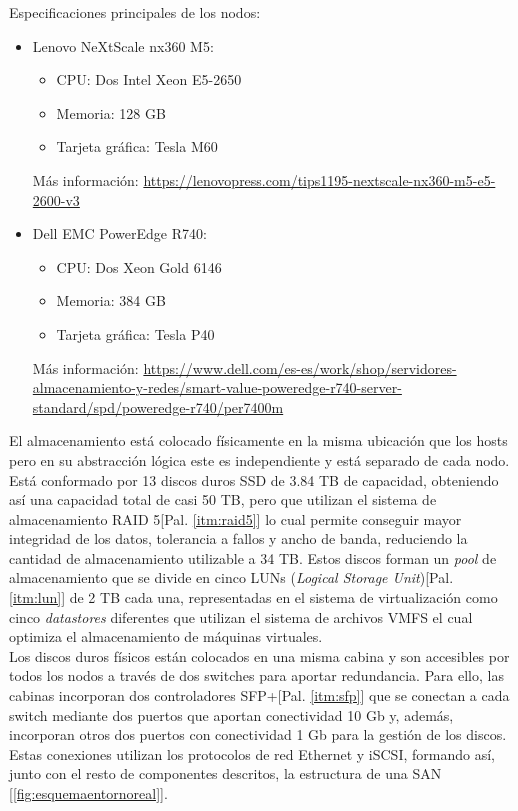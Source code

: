 Especificaciones principales de los nodos:
\begin{itemize}
    \item Lenovo NeXtScale nx360 M5: 
        \begin{itemize}
            \item CPU: Dos Intel Xeon E5-2650
            \item Memoria: 128 GB
            \item Tarjeta  gráfica: Tesla M60
        \end{itemize}
            Más información: \url{https://lenovopress.com/tips1195-nextscale-nx360-m5-e5-2600-v3}
    \item Dell EMC PowerEdge R740:
        \begin{itemize}
            \item CPU: Dos Xeon Gold 6146
            \item Memoria: 384 GB
            \item Tarjeta gráfica: Tesla P40
        \end{itemize}
    Más información: \url{https://www.dell.com/es-es/work/shop/servidores-almacenamiento-y-redes/smart-value-poweredge-r740-server-standard/spd/poweredge-r740/per7400m}
\end{itemize}
El almacenamiento está colocado físicamente en la misma ubicación que los hosts pero en su abstracción lógica este es independiente y está separado de cada nodo. Está conformado por 13 discos duros SSD de 3.84 TB de capacidad, obteniendo así una capacidad total de casi 50 TB, pero que utilizan el sistema de almacenamiento RAID 5[Pal. \ref{itm:raid5}] lo cual permite conseguir mayor  integridad de los datos, tolerancia a fallos y ancho de banda, reduciendo la cantidad de almacenamiento utilizable a 34 TB. Estos discos forman un \textit{pool} de almacenamiento que se divide en cinco LUNs (\textit{Logical Storage Unit})[Pal. \ref{itm:lun}] de 2 TB cada una, representadas en el sistema de virtualización como cinco \textit{datastores} diferentes que utilizan el sistema de archivos VMFS el cual optimiza el almacenamiento de máquinas virtuales.\\
Los discos duros físicos están colocados en una misma cabina y son accesibles por todos los nodos a través de dos switches para aportar redundancia. Para ello, las cabinas incorporan dos controladores SFP+[Pal. \ref{itm:sfp}] que se conectan a cada switch mediante dos puertos que aportan conectividad 10 Gb y, además, incorporan otros dos puertos con conectividad 1 Gb para la gestión de los discos. Estas conexiones utilizan los protocolos de red Ethernet y iSCSI, formando así, junto con el resto de componentes descritos, la estructura de una SAN [\ref{fig:esquemaentornoreal}].\\

